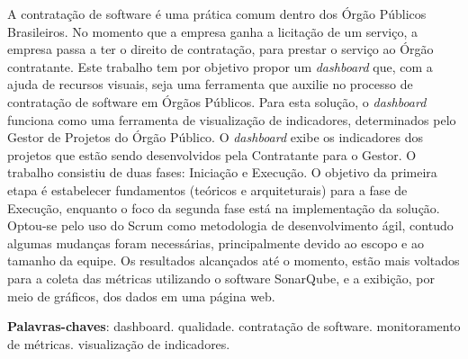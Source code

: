 \begin{resumo}
A contratação de software é uma prática comum dentro dos Órgão Públicos Brasileiros. No momento que a empresa ganha a licitação de um serviço, a empresa passa a ter o direito de contratação, para prestar o serviço ao Órgão contratante. Este trabalho tem por objetivo propor um \textit{dashboard} que, com a ajuda de recursos visuais, seja uma ferramenta que auxilie no processo de contratação de software em Órgãos Públicos. Para esta solução, o \textit{dashboard} funciona como uma ferramenta de visualização de indicadores, determinados pelo Gestor de Projetos do Órgão Público. O \textit{dashboard} exibe os indicadores dos projetos que estão sendo desenvolvidos pela Contratante para o Gestor. O trabalho consistiu de duas fases: Iniciação e Execução. O objetivo da primeira etapa é estabelecer fundamentos (teóricos e arquiteturais) para a fase de Execução, enquanto o foco da segunda fase está na implementação da solução. Optou-se pelo uso do Scrum como metodologia de desenvolvimento ágil, contudo algumas mudanças foram necessárias, principalmente devido ao escopo e ao tamanho da equipe. Os resultados alcançados até o momento, estão mais voltados para a coleta das métricas utilizando o software SonarQube, e a exibição, por meio de gráficos, dos dados em uma página web. 
 \vspace{\onelineskip}
 
    
 \noindent
 \textbf{Palavras-chaves}: dashboard. qualidade. contratação de software. monitoramento de métricas. visualização de indicadores.

\end{resumo}
